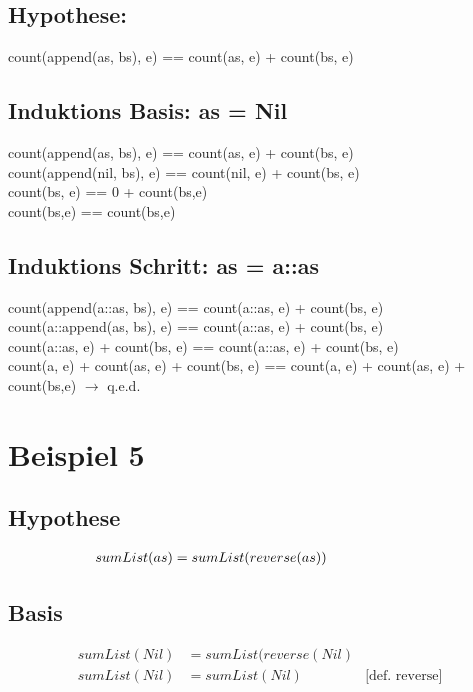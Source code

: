 \documentclass[12pt,runningheads,a4paper]{llncs}
\begin{document}
\subsection*{Hypothese:}
count(append(as, bs), e) == count(as, e) + count(bs, e)
\subsection*{Induktions Basis:   as = Nil}
count(append(as, bs), e) == count(as, e) + count(bs, e)\\
count(append(nil, bs), e) == count(nil, e) + count(bs, e)\\
count(bs, e) == 0 + count(bs,e)\\
count(bs,e) == count(bs,e)


\subsection*{Induktions Schritt:   as = a::as}
count(append(a::as, bs), e) == count(a::as, e) + count(bs, e)\\
count(a::append(as, bs), e) == count(a::as, e) + count(bs, e)\\
count(a::as, e) + count(bs, e) == count(a::as, e) + count(bs, e)\\ 
count(a, e) + count(as, e) + count(bs, e) == count(a, e) + count(as, e) + count(bs,e) $\rightarrow$ q.e.d.


\section*{Beispiel 5}

\subsection*{Hypothese}
\begin{align*}
sumList(as) &= sumList(reverse(as)) & \hspace*{6em}
\end{align*}

\subsection*{Basis}
\begin{align*}
sumList(Nil) &= sumList(reverse(Nil) \\
sumList(Nil) &= sumList(Nil) & \text{[def. reverse]}
\end{align*}
\end{document}
